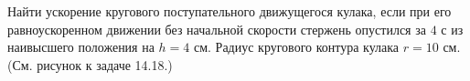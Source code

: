 Найти ускорение кругового поступательного движущегося кулака,
если при его равноускоренном движении без начальной скорости
стержень опустился за $4$ с из наивысшего положения на $h = 4$ см.
Радиус кругового контура кулака $r = 10$ см.
(См. рисунок к задаче 14.18.)
